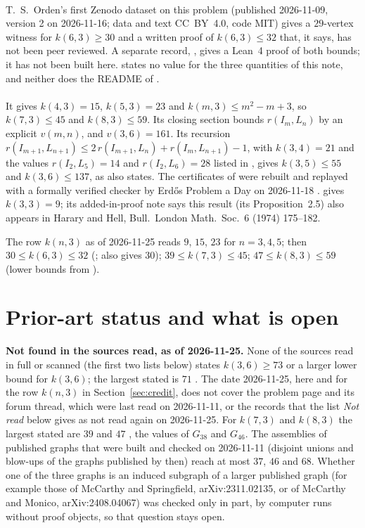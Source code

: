 \documentclass[11pt]{amsart}
\theoremstyle{plain}
\theoremstyle{definition}
\theoremstyle{remark}
\begin{document}
\paragraph{\cite{Orden}} T.~S.~Orden's first Zenodo dataset on this problem (published 2026-11-09,
version 2 on 2026-11-16; data and text CC~BY~4.0, code MIT) gives a $29$-vertex witness for
$k(6,3)\geq 30$ and a written proof of $k(6,3)\leq 32$ that, it says, has not been peer reviewed. A
separate record, \cite{OrdenLean}, gives a Lean~4 proof of both bounds; it has not been built here.
\cite{Orden} states no value for the three quantities of this note, and neither does the README of
\cite{OrdenLean}.

\paragraph{\cite{IRW21}} It gives $k(4,3)=15$, $k(5,3)=23$ and $k(m,3)\leq m^2-m+3$, so
$k(7,3)\leq 45$ and $k(8,3)\leq 59$. Its closing section bounds $r(I_m,L_n)$ by an explicit
$v(m,n)$, and $v(3,6)=161$. Its recursion
$r(I_{m+1},L_{n+1})\leq 2\,r(I_{m+1},L_n)+r(I_m,L_{n+1})-1$, with $k(3,4)=21$ \cite{PartG} and the
values $r(I_2,L_5)=14$ and $r(I_2,L_6)=28$ listed in \cite{IRW21}, gives $k(3,5)\leq 55$ and
$k(3,6)\leq 137$, as \cite{rsv} also states. The certificates of \cite{PartG} were rebuilt and
replayed with a formally verified checker by Erd\H{o}s Problem a Day on 2026-11-18 \cite{EPAD2}.
\cite{Ber74} gives $k(3,3)=9$; its added-in-proof note says this result (its Proposition~2.5) also
appears in Harary and Hell, Bull.\ London Math.\ Soc.\ 6 (1974) 175--182.

\medskip
The row $k(n,3)$ as of 2026-11-25 reads $9$, $15$, $23$ for $n=3,4,5$; then $30\leq k(6,3)\leq 32$
(\cite{Orden}; \cite{rsv} also gives $30$); $39\leq k(7,3)\leq 45$; $47\leq k(8,3)\leq 59$ (lower
bounds from \cite{Orden2}).

\section{Prior-art status and what is open}\label{sec:prior}

\noindent\textbf{Not found in the sources read, as of 2026-11-25.} None of the sources read in full
or scanned (the first two lists below) states $k(3,6)\geq 73$ or a larger lower bound for $k(3,6)$;
the largest stated is $71$ \cite{Orden2}. The date 2026-11-25, here and for the row $k(n,3)$ in
Section~\ref{sec:credit}, does not cover the problem page \cite{Blo} and its forum thread, which
were last read on 2026-11-11, or the records that the list \emph{Not read} below gives as not read
again on 2026-11-25. For $k(7,3)$ and $k(8,3)$ the largest stated are $39$ and $47$
\cite{Orden2}, the values of $G_{38}$ and $G_{46}$. The assemblies of published graphs that were
built and checked on 2026-11-11 (disjoint unions and blow-ups of the graphs published by then)
reach at most $37$, $46$ and $68$. Whether one of the three graphs is an induced subgraph of a
larger published graph (for example those of McCarthy and Springfield, arXiv:2311.02135, or of
McCarthy and Monico, arXiv:2408.04067) was checked only in part, by computer runs without proof
objects, so that question stays open.
\end{document}

